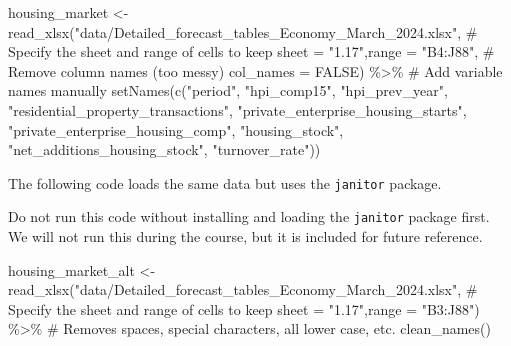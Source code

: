 \documentclass[
  letterpaper,
  DIV=11,
  numbers=noendperiod]{scrreprt}
\newenvironment{Shaded}{\begin{snugshade}}{\end{snugshade}}
\newcommand{\AttributeTok}[1]{\textcolor[rgb]{0.40,0.45,0.13}{#1}}
\newcommand{\CommentTok}[1]{\textcolor[rgb]{0.37,0.37,0.37}{#1}}
\newcommand{\ConstantTok}[1]{\textcolor[rgb]{0.56,0.35,0.01}{#1}}
\newcommand{\FunctionTok}[1]{\textcolor[rgb]{0.28,0.35,0.67}{#1}}
\newcommand{\NormalTok}[1]{\textcolor[rgb]{0.00,0.23,0.31}{#1}}
\newcommand{\OtherTok}[1]{\textcolor[rgb]{0.00,0.23,0.31}{#1}}
\newcommand{\SpecialCharTok}[1]{\textcolor[rgb]{0.37,0.37,0.37}{#1}}
\newcommand{\StringTok}[1]{\textcolor[rgb]{0.13,0.47,0.30}{#1}}
\begin{document}
\begin{Shaded}
\begin{Highlighting}[]
\NormalTok{housing\_market }\OtherTok{\textless{}{-}} 
  \FunctionTok{read\_xlsx}\NormalTok{(}\StringTok{"data/Detailed\_forecast\_tables\_Economy\_March\_2024.xlsx"}\NormalTok{,}
                            \CommentTok{\# Specify the sheet and range of cells to keep}
                            \AttributeTok{sheet =} \StringTok{"1.17"}\NormalTok{,}\AttributeTok{range =} \StringTok{"B4:J88"}\NormalTok{, }
                            \CommentTok{\# Remove column names (too messy)}
                            \AttributeTok{col\_names =} \ConstantTok{FALSE}\NormalTok{) }\SpecialCharTok{\%\textgreater{}\%} 
  \CommentTok{\# Add variable names manually}
  \FunctionTok{setNames}\NormalTok{(}\FunctionTok{c}\NormalTok{(}\StringTok{"period"}\NormalTok{, }\StringTok{"hpi\_comp15"}\NormalTok{, }\StringTok{"hpi\_prev\_year"}\NormalTok{, }
             \StringTok{"residential\_property\_transactions"}\NormalTok{, }
             \StringTok{"private\_enterprise\_housing\_starts"}\NormalTok{,}
             \StringTok{"private\_enterprise\_housing\_comp"}\NormalTok{, }
             \StringTok{"housing\_stock"}\NormalTok{, }\StringTok{"net\_additions\_housing\_stock"}\NormalTok{,}
             \StringTok{"turnover\_rate"}\NormalTok{))}
\end{Highlighting}
\end{Shaded}

The following code loads the same data but uses the \texttt{janitor}
package.

\begin{tcolorbox}[enhanced jigsaw, bottomrule=.15mm, left=2mm, leftrule=.75mm, bottomtitle=1mm, coltitle=black, colbacktitle=quarto-callout-warning-color!10!white, toptitle=1mm, arc=.35mm, breakable, title=\textcolor{quarto-callout-warning-color}{\faExclamationTriangle}\hspace{0.5em}{Warning}, rightrule=.15mm, toprule=.15mm, opacityback=0, opacitybacktitle=0.6, titlerule=0mm, colback=white, colframe=quarto-callout-warning-color-frame]

Do not run this code without installing and loading the \texttt{janitor}
package first. We will not run this during the course, but it is
included for future reference.

\end{tcolorbox}

\begin{Shaded}
\begin{Highlighting}[]
\NormalTok{housing\_market\_alt }\OtherTok{\textless{}{-}}
  \FunctionTok{read\_xlsx}\NormalTok{(}\StringTok{"data/Detailed\_forecast\_tables\_Economy\_March\_2024.xlsx"}\NormalTok{,}
                                \CommentTok{\# Specify the sheet and range of cells to keep}
                                \AttributeTok{sheet =} \StringTok{"1.17"}\NormalTok{,}\AttributeTok{range =} \StringTok{"B3:J88"}\NormalTok{) }\SpecialCharTok{\%\textgreater{}\%} 
  \CommentTok{\# Removes spaces, special characters, all lower case, etc.}
  \FunctionTok{clean\_names}\NormalTok{()}
\end{Highlighting}
\end{Shaded}
\end{document}
